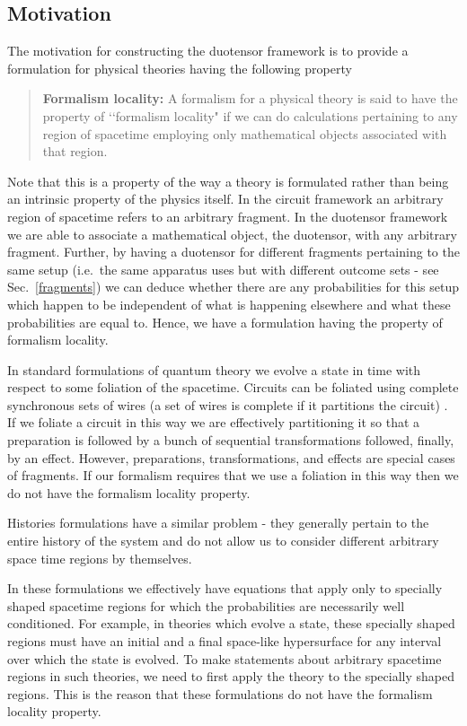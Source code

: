 \documentclass[10pt]{article}
\begin{document}
\subsection{Motivation}

The motivation for constructing the duotensor framework is to provide a formulation for physical theories having the following property
\begin{quote}
{\bf Formalism locality:} A formalism for a physical theory is said to have the property of \lq\lq formalism locality" if we can do calculations pertaining to any region of spacetime employing only mathematical objects associated with that region.
\end{quote}
Note that this is a property of the way a theory is formulated rather than being an intrinsic property of the physics itself.  In the circuit framework an arbitrary region of spacetime refers to an arbitrary fragment.  In the duotensor framework we are able to associate a mathematical object, the duotensor, with any arbitrary fragment.  Further, by having a duotensor for different fragments pertaining to the same setup (i.e.\ the same apparatus uses but with different outcome sets - see Sec.\ \ref{fragments}) we can deduce whether there are any probabilities for this setup which happen to be independent of what is happening elsewhere and what these probabilities are equal to.  Hence, we have a formulation having the property of formalism locality.

In standard formulations of quantum theory we evolve a state in time with respect to some foliation of the spacetime.  Circuits can be foliated using complete synchronous sets of wires (a set of wires is complete if it partitions the circuit) \cite{hardy2010formalism}.  If we foliate a circuit in this way we are effectively partitioning it so that a preparation is followed by a bunch of sequential transformations followed, finally, by an effect.  However, preparations, transformations, and effects are special cases of fragments.  If our formalism requires that we use a foliation in this way then we do not have the formalism locality property.

Histories formulations have a similar problem - they generally pertain to the entire history of the system and do not allow us to consider different arbitrary space time regions by themselves.

In these formulations we effectively have equations that apply only to specially shaped spacetime regions for which the probabilities are necessarily well conditioned.  For example, in theories which evolve a state, these specially shaped regions must have an initial and a final space-like hypersurface for any interval over which the state is evolved.  To make statements about arbitrary spacetime regions in such theories, we need to first apply the theory to the specially shaped regions.  This is the reason that these formulations do not have the formalism locality property.
\end{document}
